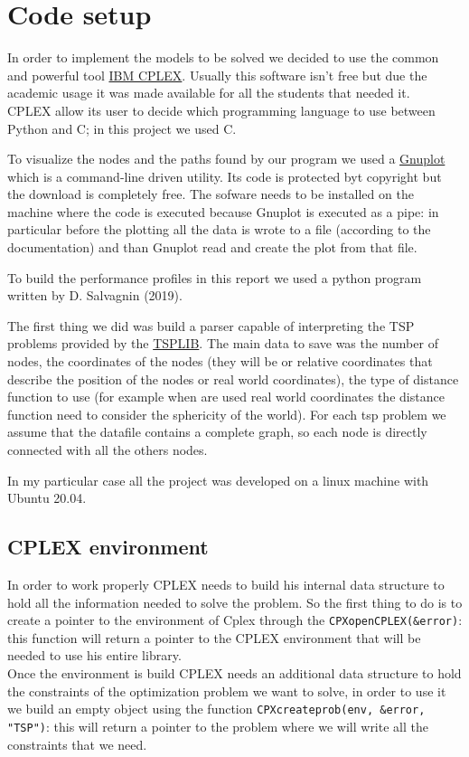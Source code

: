 \section{Code setup}
\label{sec:setup}
In order to implement the models to be solved we decided to use the common and powerful tool \href{https://www.ibm.com/products/ilog-cplex-optimization-studio}{IBM CPLEX}. Usually this software isn't free but due the academic usage it was made available for all the students that needed it.\\
CPLEX allow its user to decide which programming language to use between Python and C; in this project we used C.

To visualize the nodes and the paths found by our program we used a \href{https://www.gnuplot.info}{Gnuplot} which is a command-line driven utility. Its code is protected byt copyright but the download is completely free. The sofware needs to be installed on the machine where the code is executed because Gnuplot is executed as a pipe: in particular before the plotting all the data is wrote to a file (according to the documentation) and than Gnuplot read and create the plot from that file.

To build the performance profiles in this report we used a python program written by D. Salvagnin (2019).


The first thing we did was build a parser capable of interpreting the TSP problems provided by the \href{http://comopt.ifi.uni-heidelberg.de/software/TSPLIB95/}{TSPLIB}. The main data to save was the number of nodes, the coordinates of the nodes (they will be or relative coordinates that describe the position of the nodes or real world coordinates), the type of distance function to use (for example when are used real world coordinates the distance function need to consider the sphericity of the world). For each tsp problem we assume that the datafile contains a complete graph, so each node is directly connected with all the others nodes.

In my particular case all the project was developed on a linux machine with Ubuntu 20.04.

\subsection{CPLEX environment}
\label{cap:2_int}
In order to work properly CPLEX needs to build his internal data structure to hold all the information needed to solve the problem. So the first thing to do is to create a pointer to the environment of Cplex through the \verb|CPXopenCPLEX(&error)|: this function will return a pointer to the CPLEX environment that will be needed to use his entire library.\\
Once the environment is build CPLEX needs an additional data structure to hold the constraints of the optimization problem we want to solve, in order to use it we build an empty object using the function \verb|CPXcreateprob(env, &error, "TSP")|: this will return a pointer to the problem where we will write all the constraints that we need.

